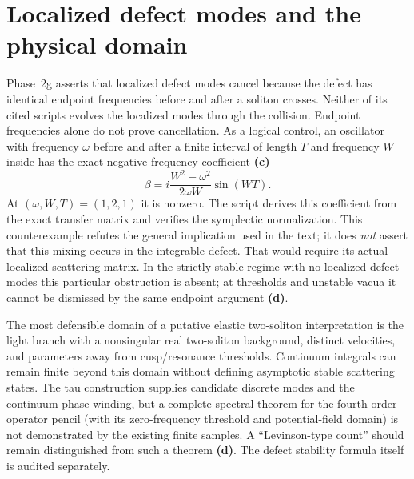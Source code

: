 \documentclass[11pt]{article}
\newcommand{\Lc}{\textbf{(c)}}
\newcommand{\Ld}{\textbf{(d)}}
\begin{document}
\section{Localized defect modes and the physical domain}
Phase~2g asserts that localized defect modes cancel because the defect has
identical endpoint frequencies before and after a soliton crosses. Neither
of its cited scripts evolves the localized modes through the collision.
Endpoint frequencies alone do not prove cancellation. As a logical control,
an oscillator with frequency $\omega$ before and after a finite interval of
length $T$ and frequency $W$ inside has the exact negative-frequency
coefficient \Lc
\begin{equation}
 \beta=i\frac{W^2-\omega^2}{2\omega W}\sin(WT).\tag{c}
\end{equation}
At $(\omega,W,T)=(1,2,1)$ it is nonzero. The script derives this coefficient
from the exact transfer matrix and verifies the symplectic normalization.
This counterexample refutes the general implication used in the text;
it does \emph{not} assert that this mixing occurs in the integrable defect.
That would require its actual localized scattering matrix. In the strictly
stable regime with no localized defect modes this particular obstruction
is absent; at thresholds and unstable vacua it cannot be dismissed by the
same endpoint argument \Ld.

The most defensible domain of a putative elastic two-soliton interpretation
is the light branch with a nonsingular real two-soliton background, distinct
velocities, and parameters away from cusp/resonance thresholds. Continuum
integrals can remain finite beyond this domain without defining asymptotic
stable scattering states. The tau construction supplies candidate discrete
modes and the continuum phase winding, but a complete spectral theorem for
the fourth-order operator pencil (with its zero-frequency threshold and
potential-field domain) is not demonstrated by the existing finite samples.
A ``Levinson-type count'' should remain distinguished from such a theorem
\Ld. The defect stability formula itself is audited separately.
\end{document}
